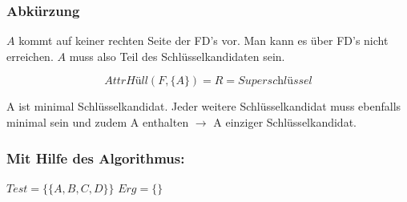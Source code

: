 \documentclass{lehramt-informatik-haupt}
\begin{document}
%

\subsubsection{Abkürzung}

$A$ kommt auf keiner rechten Seite der FD’s vor.
Man kann es über FD's nicht erreichen. $A$ muss also Teil des
Schlüsselkandidaten sein.

\begin{equation*}
\textit{AttrHüll}(F, \{A\}) = R = \textit{Superschlüssel}
\end{equation*}

A ist minimal Schlüsselkandidat.
%
Jeder weitere Schlüsselkandidat muss ebenfalls minimal sein und zudem
A enthalten $\rightarrow$ A einziger Schlüsselkandidat.

%

\subsubsection{Mit Hilfe des Algorithmus:}

$Test = \{\{A, B, C, D\}\}$ $Erg = \{\}$
\end{document}
